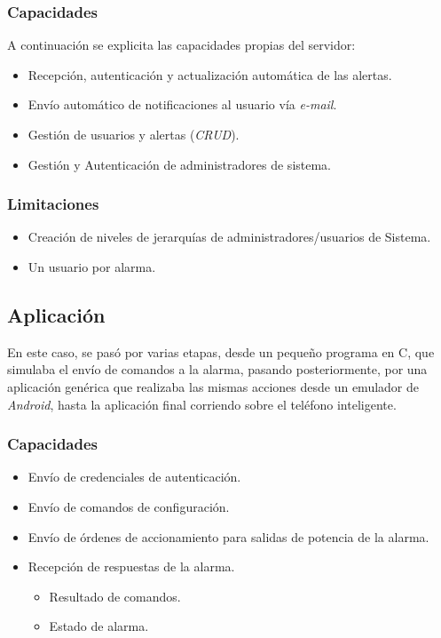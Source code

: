 		\subsubsection{Capacidades}
A continuación se explicita las capacidades propias del servidor:

\begin{itemize}
\item Recepción, autenticación y actualización automática de las alertas.
\item Envío automático de notificaciones al usuario vía \textit{e-mail}.
\item Gestión de usuarios y alertas (\textit{CRUD}).
\item Gestión y Autenticación de administradores de sistema.
\end{itemize}
		\subsubsection{Limitaciones}
\begin{itemize}
\item Creación de niveles de jerarquías de administradores/usuarios de Sistema.
\item Un usuario por alarma.
\end{itemize}		


\newpage		

\subsection{Aplicación}

En este caso, se pasó por varias etapas, desde un pequeño programa en C, que simulaba el envío de comandos a la alarma, pasando posteriormente, por una aplicación genérica que realizaba las mismas acciones desde un emulador de \textit{Android}, hasta la aplicación final corriendo sobre el teléfono inteligente.

		\subsubsection{Capacidades}
\begin{itemize}
\item Envío de credenciales de autenticación.
\item Envío de comandos de configuración.
\item Envío de órdenes de accionamiento para salidas de potencia de la alarma.
\item Recepción de respuestas de la alarma.
	\begin{itemize}
	\item Resultado de comandos.
	\item Estado de alarma.
	\end{itemize}
\end{itemize}		

